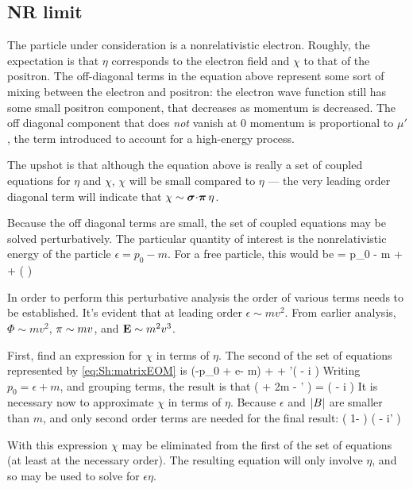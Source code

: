 \subsection{NR limit}

The particle under consideration is a nonrelativistic electron.  Roughly, the expectation is that $\eta$ corresponds to the electron field and $\chi$ to that of the positron.  The off-diagonal terms in the equation above represent some sort of mixing between the electron and positron: the electron wave function still has some small positron component, that decreases as momentum is decreased.    The off diagonal component that does {\it not} vanish at 0 momentum is proportional to $\mu'$, the term introduced to account for a high-energy process.

The upshot is that although the equation above is really a set of coupled equations for $\eta$ and $\chi$, $\chi$ will be small compared to $\eta$ --- the very leading order diagonal term will indicate that $\chi \sim \mbox{\boldmath$ \sigma $} \hspace{-2pt} \cdot \hspace{-2pt} \mbox{\boldmath$ \pi $} \, \eta$.

Because the off diagonal terms are small, the set of coupled equations may be solved perturbatively.  The particular quantity of interest is the nonrelativistic energy of the particle $\epsilon = p_0 - m$.  For a free particle, this would be
\beq
	\epsilon = p_0 - m \approx {} +  + \left ( \right )
\eeq  

In order to perform this perturbative analysis the order of various terms needs to be established.  It's evident that at leading order $\epsilon \sim mv^2$.  From earlier analysis,   $\Phi\sim mv^2$, $\mathbf{\pi} \sim mv$, and $\mathbf{E} \sim m^2v^3$.

First, find an expression for $\chi$ in terms of $\eta$.  The second of the set of equations represented by \eqref{eq:Sh:matrixEOM} is
\beq
	(-p_0 + e\Phi - m) \chi + \sigdotg{\pi} \eta + \mu'(  \chi - i   \eta)
\eeq
Writing $p_0 = \epsilon + m$, and grouping terms, the result is that
\beq
	\left( \epsilon + 2m - \mu'  \right ) \chi = \left( \sigdotg{\pi} - i \right) \eta	
\eeq
It is necessary now to approximate $\chi$ in terms of $\eta$.  Because $\epsilon$ and $\left| B \right|$ are smaller than $m$, and only second order terms are needed for the final result:
\beq
	\chi \approx	{} \left ( 1-  \right ) (\sigdotg{\pi} - i\mu'  )\phi
\eeq

With this expression $\chi$ may be eliminated from the first of the set of equations (at least at the necessary order).  The resulting equation will only involve $\eta$, and so may be used to solve for $\epsilon \eta$.

